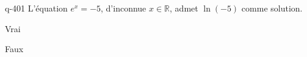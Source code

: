 \begin{truefalse}{q-401}
L'équation $e^x=-5$, d'inconnue $x\in \mathbb R$, admet $\ln(-5)$ comme solution.
\item Vrai
\item* Faux
\end{truefalse}


